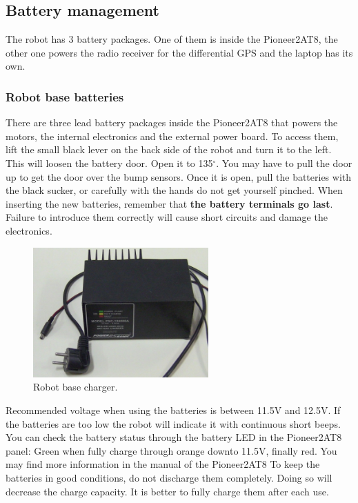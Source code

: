 \subsection{Battery management}
The robot has 3 battery packages. One of them is inside the Pioneer2AT8, the other one powers the radio receiver
for the differential GPS and the laptop has its own.

\subsubsection{Robot base batteries}
There are three lead battery packages inside the Pioneer2AT8 that powers the motors, the internal electronics and
the external power board. To access them, lift the small black lever on the back side of the robot and turn it to the left.
This will loosen the battery door. Open it to 135$^{\circ}$. You may have to pull the door up to get the door over the
bump sensors. Once it is open, pull the batteries with the black sucker, or carefully with the hands do not get yourself
pinched. When inserting the new batteries, remember that \textbf{the battery terminals go last}. Failure to introduce
them correctly will cause short circuits and damage the electronics.

\begin{figure}[ht]
\centering
 \includegraphics[width=0.6\textwidth]{figures/device_photos/rover_charger.jpg}
\caption{Robot base charger.}
\label{fig:base_battery_charger}
\end{figure}

Recommended voltage when using the batteries is between 11.5V and 12.5V. If the batteries are too low the robot
will indicate it with continuous short beeps. You can check the battery status through the battery LED in the
Pioneer2AT8 panel: Green when fully charge through orange downto 11.5V, finally red. You may find more information in the manual of the Pioneer2AT8 To keep the batteries in good
conditions, do not discharge them completely. Doing so will decrease the charge capacity. It is better to
fully charge them after each use.

